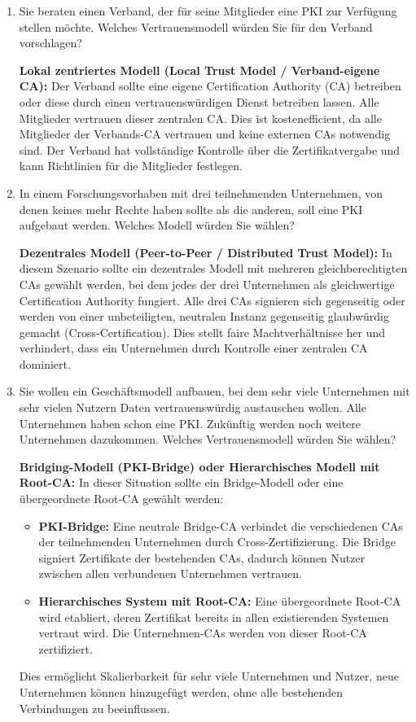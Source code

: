 \documentclass[a4paper]{article}
\begin{document}
\begin{enumerate}
    \item Sie beraten einen Verband, der für seine Mitglieder eine PKI zur Verfügung stellen möchte. Welches Vertrauensmodell würden Sie für den Verband vorschlagen?
    
    \textbf{Lokal zentriertes Modell (Local Trust Model / Verband-eigene CA):} 
    Der Verband sollte eine eigene Certification Authority (CA) betreiben oder diese durch einen vertrauenswürdigen Dienst betreiben lassen. Alle Mitglieder vertrauen dieser zentralen CA. Dies ist kostenefficient, da alle Mitglieder der Verbands-CA vertrauen und keine externen CAs notwendig sind. Der Verband hat vollständige Kontrolle über die Zertifikatvergabe und kann Richtlinien für die Mitglieder festlegen.

    \item In einem Forschungsvorhaben mit drei teilnehmenden Unternehmen, von denen keines mehr Rechte haben sollte als die anderen, soll eine PKI aufgebaut werden. Welches Modell würden Sie wählen?
    
    \textbf{Dezentrales Modell (Peer-to-Peer / Distributed Trust Model):}
    In diesem Szenario sollte ein dezentrales Modell mit mehreren gleichberechtigten CAs gewählt werden, bei dem jedes der drei Unternehmen als gleichwertige Certification Authority fungiert. Alle drei CAs signieren sich gegenseitig oder werden von einer unbeteiligten, neutralen Instanz gegenseitig glaubwürdig gemacht (Cross-Certification). Dies stellt faire Machtverhältnisse her und verhindert, dass ein Unternehmen durch Kontrolle einer zentralen CA dominiert.

    \item Sie wollen ein Geschäftsmodell aufbauen, bei dem sehr viele Unternehmen mit sehr vielen Nutzern Daten vertrauenswürdig austauschen wollen. Alle Unternehmen haben schon eine PKI. Zukünftig werden noch weitere Unternehmen dazukommen. Welches Vertrauensmodell würden Sie wählen?
    
    \textbf{Bridging-Modell (PKI-Bridge) oder Hierarchisches Modell mit Root-CA:}
    In dieser Situation sollte ein Bridge-Modell oder eine übergeordnete Root-CA gewählt werden:
    \begin{itemize}
        \item \textbf{PKI-Bridge:} Eine neutrale Bridge-CA verbindet die verschiedenen CAs der teilnehmenden Unternehmen durch Cross-Zertifizierung. Die Bridge signiert Zertifikate der bestehenden CAs, dadurch können Nutzer zwischen allen verbundenen Unternehmen vertrauen.
        \item \textbf{Hierarchisches System mit Root-CA:} Eine übergeordnete Root-CA wird etabliert, deren Zertifikat bereits in allen existierenden Systemen vertraut wird. Die Unternehmen-CAs werden von dieser Root-CA zertifiziert.
    \end{itemize}
    
    Dies ermöglicht Skalierbarkeit für sehr viele Unternehmen und Nutzer, neue Unternehmen können hinzugefügt werden, ohne alle bestehenden Verbindungen zu beeinflussen.
\end{enumerate}
\end{document}
